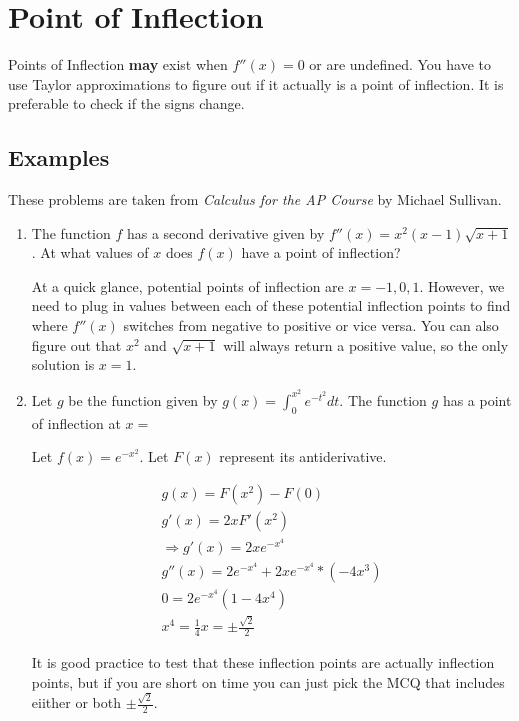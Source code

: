 \documentclass{article}
\begin{document}
\section{Point of Inflection}

Points of Inflection \textbf{may} exist when $f''(x)=0$ or are undefined. You have to use Taylor approximations to figure out if it actually is a point of inflection. It is preferable to check if the signs change.

\subsection{Examples}

These problems are taken from \textit{Calculus for the AP Course} by Michael Sullivan. 

\begin{enumerate}
    \item The function $f$ has a second derivative given by $f''(x)=x^2(x-1)\sqrt{x+1}$. At what values of $x$ does $f(x)$ have a point of inflection?

    At a quick glance, potential points of inflection are $x=-1,0,1$. However, we need to plug in values between each of these potential inflection points to find where $f''(x)$ switches from negative to positive or vice versa. You can also figure out that $x^2$ and $\sqrt{x+1}$ will always return a positive value, so the only solution is $x=1$.

    \item Let $g$ be the function given by $g(x)=\int_0^{x^2}{e^{-t^2}}dt$. The function $g$ has a point of inflection at $x=$

    Let $f(x)=e^{-x^2}$. Let $F(x)$ represent its antiderivative.

    \begin{align*}
        g(x)=F(x^2)-F(0) \\
        g'(x)=2xF'(x^2) \\
        \Longrightarrow g'(x)=2xe^{-x^4} \\
        g''(x)=2e^{-x^4}+2xe^{-x^4}*(-4x^3) \\
        0=2e^{-x^4}(1-4x^4) \\
        x^4=\frac{1}{4}
        x=\pm \frac{\sqrt{2}}{2}
    \end{align*}

    It is good practice to test that these inflection points are actually inflection points, but if you are short on time you can just pick the MCQ that includes eiither or both $\pm\frac{\sqrt{2}}{2}$.

\end{enumerate}
\end{document}
